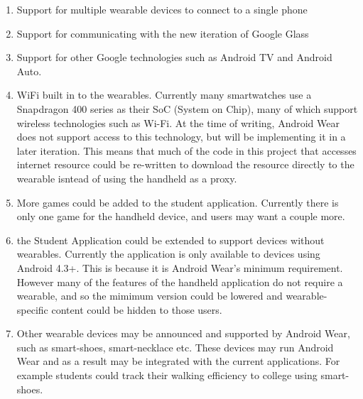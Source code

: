 \begin{enumerate}
\item Support for multiple wearable devices to connect to a single phone
\item Support for communicating with the new iteration of Google Glass
\item Support for other Google technologies such as Android TV and Android Auto.
\item WiFi built in to the wearables. Currently many smartwatches use a
    Snapdragon 400 series as their SoC (System on Chip), many of which support
    wireless technologies such as Wi-Fi. At the time of writing, Android Wear
    does not support access to this technology, but will be implementing it in
    a later iteration. This means that much of the code in this project that
    accesses internet resource could be re-written to download the resource
    directly to the wearable isntead of using the handheld as a proxy.
\item More games could be added to the student application. Currently there is
    only one game for the handheld device, and users may want a couple more.
\item the Student Application could be extended to support devices without
    wearables. Currently the application is only available to devices using 
    Android 4.3+. This is because it is Android Wear's minimum requirement.
    However many of the features of the handheld application do not require
    a wearable, and so the mimimum version could be lowered and
    wearable-specific content could be hidden to those users.
\item Other wearable devices may be announced and supported by Android Wear,
    such as smart-shoes, smart-necklace etc. These devices may run Android Wear
    and as a result may be integrated with the current applications. For example
    students could track their walking efficiency to college using smart-shoes.
\end{enumerate}
